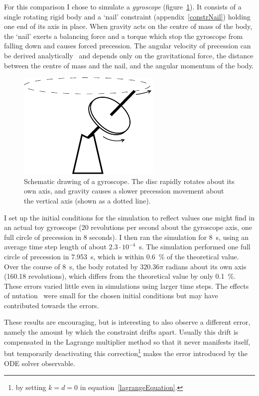 For this comparison I chose to simulate a \emph{gyroscope} (figure~\ref{gyroscope}). It consists
of a single rotating rigid body and a `nail' constraint (appendix~\ref{constrNail}) holding one
end of its axis in place. When gravity acts on the centre of mass of the body, the `nail' exerts
a balancing force and a torque which stop the gyroscope from falling down and causes forced
precession. The angular velocity of precession can be derived analytically~\cite{Julian:notes}
and depends only on the gravitational force, the distance between the centre of mass and the
nail, and the angular momentum of the body.

\begin{figure}
\centerline{\includegraphics{figures/gyroscope}}
\caption{Schematic drawing of a gyroscope. The disc rapidly rotates about its own axis, and
    gravity causes a slower precession movement about the vertical axis (shown as a dotted line).
    \label{gyroscope}}
\end{figure}

I set up the initial conditions for the simulation to reflect values one might find in an actual
toy gyroscope (20 revolutions per second about the gyroscope axis, one full circle of precession
in 8 seconds). I then ran the simulation for 8~s, using an average time step length of about
$2.3\cdot 10^{-4}$~s. The simulation performed one full circle of precession in 7.953~s, which
is within 0.6~\% of the theoretical value. Over the course of 8~s, the body rotated by $320.36\pi$
radians about its own axis (160.18 revolutions), which differs from the theoretical value by only
0.1~\%. These errors varied little even in simulations using larger time steps.
The effects of nutation~\cite{Feynman:63} were small for the chosen initial conditions but may
have contributed towards the errors.

These results are encouraging, but is interesting to also observe a different error, namely
the amount by which the constraint drifts apart. Usually this drift is compensated in the Lagrange
multiplier method so that it never manifests itself, but temporarily deactivating this
correction\footnote{by setting $k=d=0$ in equation~\ref{lagrangeEquation}.} makes the error
introduced by the ODE solver observable.

